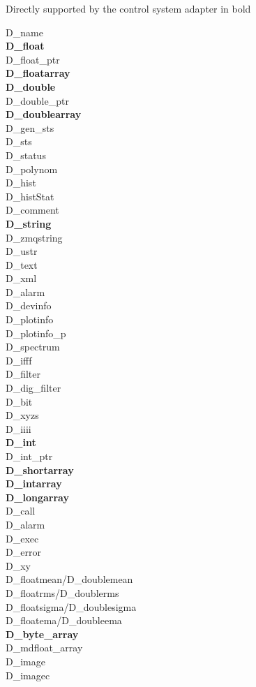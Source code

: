 \documentclass[11pt,a4paper]{scrartcl}
\begin{document}
Directly supported by the control system adapter in bold
\begin{multicols}{3}
\noindent D\_name \\
\textbf{D\_float}\\
D\_float\_ptr \\
\textbf{D\_floatarray}\\
\textbf{D\_double}\\
D\_double\_ptr \\
\textbf{D\_doublearray}\\
D\_gen\_sts \\
D\_sts \\
D\_status \\
D\_polynom \\
D\_hist \\
D\_histStat \\
D\_comment \\
\textbf{D\_string}\\
D\_zmqstring \\
D\_ustr \\
D\_text \\
D\_xml \\
D\_alarm \\
D\_devinfo \\
D\_plotinfo \\
D\_plotinfo\_p \\
D\_spectrum \\
D\_ifff \\
D\_filter \\
D\_dig\_filter \\
D\_bit \\
D\_xyzs \\
D\_iiii \\
\textbf{D\_int}\\
D\_int\_ptr \\
\textbf{D\_shortarray}\\
\textbf{D\_intarray}\\
\textbf{D\_longarray}\\
D\_call \\
D\_alarm \\
D\_exec \\
D\_error \\
D\_xy \\
D\_floatmean/D\_doublemean \\
D\_floatrms/D\_doublerms \\
D\_floatsigma/D\_doublesigma \\
D\_floatema/D\_doubleema \\
\textbf{D\_byte\_array}\\
D\_mdfloat\_array \\
D\_image \\
D\_imagec
\end{multicols}
\end{document}
